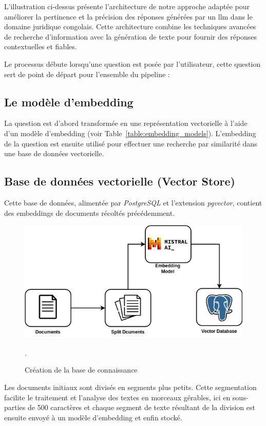 L'illustration ci-dessus présente l'architecture de notre approche adaptée pour améliorer la pertinence et la précision des réponses générées par un \ac{llm} dans le domaine juridique congolais. Cette architecture combine les techniques avancées de recherche d'information avec la génération de texte pour fournir des réponses contextuelles et fiables.

Le processus débute lorsqu'une question est posée par l'utilisateur, cette question sert de point de départ pour l'ensemble du pipeline :

\subsection{Le modèle d'embedding}
La question est d'abord transformée en une représentation vectorielle à l'aide d'un modèle d'embedding (voir Table~\ref{table:embedding_models}). L'embedding de la question est ensuite utilisé pour effectuer une recherche par similarité dans une base de données vectorielle. 

\subsection{Base de données vectorielle (Vector Store)}
\label{ch:2:section:vector-store}

Cette base de données, alimentée par \textit{PostgreSQL} et l'extension \textit{pgvector}, contient des embeddings de documents récoltés précédemment.

\begin{figure}[H]
    \centering
    \includegraphics[width=12cm]{gfx/fig-knowledge-base.png}
    \caption{Création de la base de connaissance}.
    \label{fig:knowledge-base}
\end{figure}

Les documents initiaux sont divisés en segments plus petits. Cette segmentation facilite le traitement et l'analyse des textes en morceaux gérables, ici en sous-parties de 500 caractères et chaque segment de texte résultant de la division est ensuite envoyé à un modèle d'embedding et enfin stocké. 

